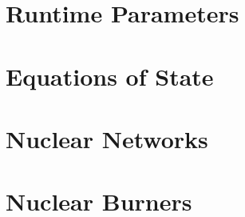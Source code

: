 \documentclass[11pt]{book}
\begin{document}
\chapter{Runtime Parameters}
\label{chapter:parameters}




\chapter{Equations of State}
\label{chapter:eos}




\chapter{Nuclear Networks}
\label{chapter:networks}



\chapter{Nuclear Burners}
\label{chapter:burners}



\backmatter

\renewcommand\bibname{References}


\end{document}
